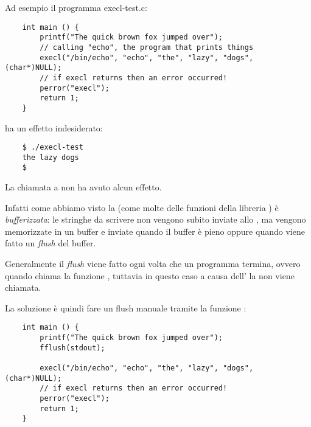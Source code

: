 Ad esempio il programma \textsf{execl-test.c}:
\begin{verbatim}
    int main () {
        printf("The quick brown fox jumped over");
        // calling "echo", the program that prints things
        execl("/bin/echo", "echo", "the", "lazy", "dogs", (char*)NULL); 
        // if execl returns then an error occurred!
        perror("execl");
        return 1;
    }
\end{verbatim}
ha un effetto indesiderato:
\begin{verbatim}
    $ ./execl-test
    the lazy dogs
    $ 
\end{verbatim}

La chiamata a  non ha avuto alcun effetto.

Infatti come abbiamo visto la  (come molte delle funzioni della libreria ) è \emph{bufferizzata}: le stringhe da scrivere non vengono subito inviate allo , ma vengono memorizzate in un buffer e inviate quando il buffer è pieno oppure quando viene fatto un \emph{flush} del buffer.

Generalmente il \emph{flush} viene fatto ogni volta che un programma termina, ovvero quando chiama la funzione , tuttavia in questo caso a causa dell' la  non viene chiamata.

La soluzione è quindi fare un flush manuale tramite la funzione :
\begin{verbatim}
    int main () {
        printf("The quick brown fox jumped over");
        fflush(stdout);
        
        execl("/bin/echo", "echo", "the", "lazy", "dogs", (char*)NULL); 
        // if execl returns then an error occurred!
        perror("execl");
        return 1;
    }
\end{verbatim}